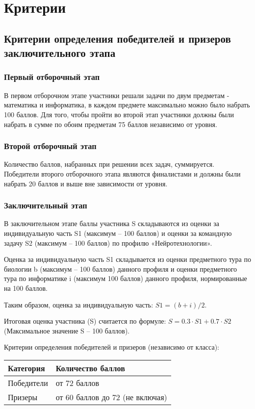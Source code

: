 \part{Критерии}

\chapter{Критерии определения победителей и призеров заключительного этапа}
 
\section{Первый отборочный этап}

В первом отборочном этапе участники решали задачи по двум предметам - математика и информатика, в каждом предмете максимально можно было набрать 100 баллов. Для того, чтобы пройти во второй этап участники должны были набрать в сумме по обоим предметам 75 баллов независимо от уровня.

\section{Второй отборочный этап}

Количество баллов, набранных при решении всех задач, суммируется. Победители второго отборочного этапа являются финалистами и должны были набрать 20 баллов и выше вне зависимости от уровня.

\section{Заключительный этап}

В заключительном этапе баллы участника S складываются из оценки за индивидуальную часть S1 (максимум – 100 баллов) и оценки за командную задачу S2 (максимум – 100 баллов) по профилю «Нейротехнологии».  

Оценка за индивидуальную часть S1 складывается из оценки предметного тура по биологии b (максимум – 100 баллов) данного профиля и оценки предметного тура по информатике i (максимум 100 баллов) данного профиля, нормированные на 100 баллов. 

Таким образом, оценка за индивидуальную часть: $S1 = (b + i)/2$.

Итоговая оценка участника (S) считается по формуле: $S = 0.3 \cdot S1 + 0.7 \cdot S2$ (Максимальное значение S – 100 баллов).
 
Критерии определения победителей и призеров (независимо от класса):
\begin{center}
    \begin{tabular}{|l|p{7cm}|}
        \hline
        Категория&Количество баллов\\
        \hline
        Победители&от 72 баллов \\
        \hline
        Призеры&от 60 баллов до 72 (не включая)\\
        \hline
    \end{tabular}
\end{center}